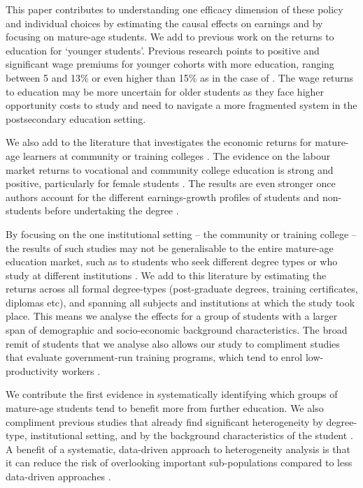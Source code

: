 \documentclass[12pt, a4paper]{article}
\begin{document}
This paper contributes to understanding one efficacy dimension of these policy and individual choices by estimating the causal effects on earnings and by focusing on mature-age students. We add to previous work on the returns to education for `younger students'. Previous research points to positive and significant wage premiums for younger cohorts with more education, ranging between 5 and 13\% \citep{angrist1991,harmon2003,machin2006} or even higher than 15\% as in the case of \cite{harmon1995}. The wage returns to education may be more uncertain for older students as they face higher opportunity costs to study and need to navigate a more fragmented system in the postsecondary education setting.

We also add to the literature that investigates the economic returns for mature-age learners at community or training colleges \citep{jacobson2005,zeiden2015,polidano2016,xu2016,belfield2017,dynarski2016,dynarski2018,mountjoy2022}. The evidence on the labour market returns to vocational and community college education is strong and positive, particularly for female students \citep{belfield2017,zeiden2015,perales2017}. The results are even stronger once authors account for the different earnings-growth profiles of students and non-students before undertaking the degree \citep{dynarski2016,dynarski2018}.

By focusing on the one institutional setting -- the community or training college -- the results of such studies may not be generalisable to the entire mature-age education market, such as to students who seek different degree types or who study at different institutions \citep{belfield2017model,mountjoy2022}. We add to this literature by estimating the returns across all formal degree-types (post-graduate degrees, training certificates, diplomas etc), and spanning all subjects and institutions at which the study took place. This means we analyse the effects for a group of students with a larger span of demographic and socio-economic background characteristics. The broad remit of students that we analyse also allows our study to compliment studies that evaluate government-run training programs, which tend to enrol low-productivity workers \citep{ashenfelter1978,ashenfelter1985,bloom1990,leigh1990,raaum2002,jacobson2005,card2018,knaus2022}. 

We contribute the first evidence in systematically identifying which groups of mature-age students tend to benefit more from further education. We also compliment previous studies that already find significant heterogeneity by degree-type, institutional setting, and by the background characteristics of the student \citep{blanden2012,zeiden2015,polidano2016,dorsett2016,xu2016,belfield2017,perales2017,bockerman2019}. A benefit of a systematic, data-driven approach to heterogeneity analysis is that it can reduce the risk of overlooking important sub-populations compared to less data-driven approaches \citep{athey2017,knaus2021}. 
\end{document}
